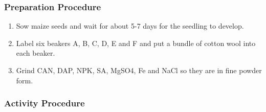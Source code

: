 \subsubsection*{Preparation Procedure}
\begin{enumerate}
\item{Sow maize seeds and wait for about 5-7 days for the seedling to develop.}
\item{Label six beakers A, B, C, D, E and F and put a bundle of cotton wool into each beaker.}
\item{Grind CAN, DAP, NPK, SA, MgSO4, Fe and NaCl so they are in fine powder form.}
\end{enumerate}
\subsubsection*{Activity Procedure}
